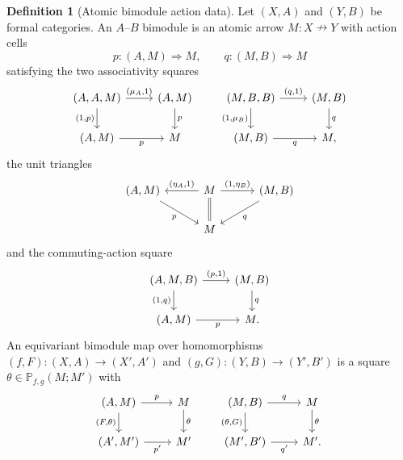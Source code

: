 \documentclass[11pt,reqno]{amsart}
\theoremstyle{plain}
\theoremstyle{definition}
\newtheorem{definition}[theorem]{Definition}
\theoremstyle{remark}
\numberwithin{equation}{section}
\newcommand{\Pcal}{\mathbb P}
\newcommand{\harr}{\mathrel{\nrightarrow}}
\newcommand{\cell}{\mathrel{\Longrightarrow}}
\begin{document}
\begin{definition}[Atomic bimodule action data]\label{def:bimodule}
Let $(X,A)$ and $(Y,B)$ be formal categories. An $A$--$B$ bimodule
is an atomic arrow $M:X\harr Y$ with action cells
\[
 p:(A,M)\cell M,\qquad q:(M,B)\cell M
\]
satisfying the two associativity squares
\begin{equation}\label{eq:leftaction}
\begin{tikzcd}[column sep=2.4em]
(A,A,M) \arrow[r,"{(\mu_A,1)}"] \arrow[d,"{(1,p)}"'] &
(A,M) \arrow[d,"p"]\\
(A,M) \arrow[r,"p"'] & M
\end{tikzcd}
\qquad
\begin{tikzcd}[column sep=2.4em]
(M,B,B) \arrow[r,"{(q,1)}"] \arrow[d,"{(1,\mu_B)}"'] &
(M,B) \arrow[d,"q"]\\
(M,B) \arrow[r,"q"'] & M,
\end{tikzcd}
\end{equation}
the unit triangles
\begin{equation}\label{eq:rightaction}
\begin{tikzcd}[column sep=3em]
(A,M) \arrow[dr,"p"'] &
M \arrow[l,"{(\eta_A,1)}"'] \arrow[r,"{(1,\eta_B)}"]
  \arrow[d,equal] &
(M,B) \arrow[dl,"q"]\\
& M &
\end{tikzcd}
\end{equation}
and the commuting-action square
\begin{equation}\label{eq:commutingactions}
\begin{tikzcd}
(A,M,B) \arrow[r,"{(p,1)}"] \arrow[d,"{(1,q)}"'] &
(M,B) \arrow[d,"q"]\\
(A,M) \arrow[r,"p"'] & M.
\end{tikzcd}
\end{equation}
An equivariant bimodule map over homomorphisms $(f,F):(X,A)\to(X',A')$
and $(g,G):(Y,B)\to(Y',B')$ is a square
$\theta\in\Pcal_{f,g}(M;M')$ with
\begin{equation}\label{eq:modulemap}
\begin{tikzcd}
(A,M) \arrow[r,"p"] \arrow[d,"{(F,\theta)}"'] & M \arrow[d,"\theta"]\\
(A',M') \arrow[r,"p'"'] & M'
\end{tikzcd}
\qquad
\begin{tikzcd}
(M,B) \arrow[r,"q"] \arrow[d,"{(\theta,G)}"'] & M \arrow[d,"\theta"]\\
(M',B') \arrow[r,"q'"'] & M'.
\end{tikzcd}
\end{equation}
\end{definition}
\end{document}
